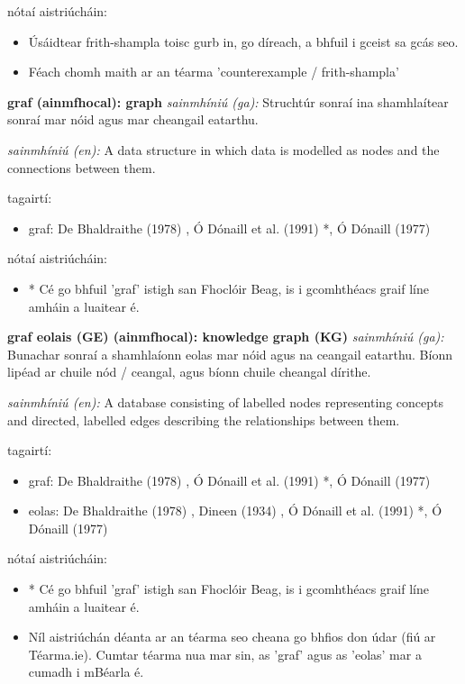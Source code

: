 \documentclass{article}
\begin{document}
nótaí aistriúcháin:
\begin{itemize}
	\item Úsáidtear frith-shampla toisc gurb in, go díreach, a bhfuil i gceist sa gcás seo.
	\item Féach chomh maith ar an téarma 'counterexample / frith-shampla'
\end{itemize}


\textbf{graf (ainmfhocal): graph}
\textit{sainmhíniú (ga):} Struchtúr sonraí ina shamhlaítear sonraí mar nóid agus mar cheangail eatarthu.

\textit{sainmhíniú (en):} A data structure in which data is modelled as nodes and the connections between them.

tagairtí:
\begin{itemize}
	\item graf: De Bhaldraithe (1978) \cite{de-bhaldraithe}, Ó Dónaill et al. (1991) \cite{focloir-beag}*, Ó Dónaill (1977) \cite{odonaill}
\end{itemize}

nótaí aistriúcháin:
\begin{itemize}
	\item * Cé go bhfuil 'graf' istigh san Fhoclóir Beag, is i gcomhthéacs graif líne amháin a luaitear é.
\end{itemize}


\textbf{graf eolais (GE) (ainmfhocal): knowledge graph (KG)}
\textit{sainmhíniú (ga):} Bunachar sonraí a shamhlaíonn eolas mar nóid agus na ceangail eatarthu. Bíonn lipéad ar chuile nód / ceangal, agus bíonn chuile cheangal dírithe.

\textit{sainmhíniú (en):} A database consisting of labelled nodes representing concepts and directed, labelled edges describing the relationships between them.

tagairtí:
\begin{itemize}
	\item graf: De Bhaldraithe (1978) \cite{de-bhaldraithe}, Ó Dónaill et al. (1991) \cite{focloir-beag}*, Ó Dónaill (1977) \cite{odonaill}
	\item eolas: De Bhaldraithe (1978) \cite{de-bhaldraithe}, Dineen (1934) \cite{dineen}, Ó Dónaill et al. (1991) \cite{focloir-beag}*, Ó Dónaill (1977) \cite{odonaill}
\end{itemize}

nótaí aistriúcháin:
\begin{itemize}
	\item * Cé go bhfuil 'graf' istigh san Fhoclóir Beag, is i gcomhthéacs graif líne amháin a luaitear é.
	\item Níl aistriúchán déanta ar an téarma seo cheana go bhfios don údar (fiú ar Téarma.ie). Cumtar téarma nua mar sin, as 'graf' agus as 'eolas' mar a cumadh i mBéarla é.
\end{itemize}
\end{document}
